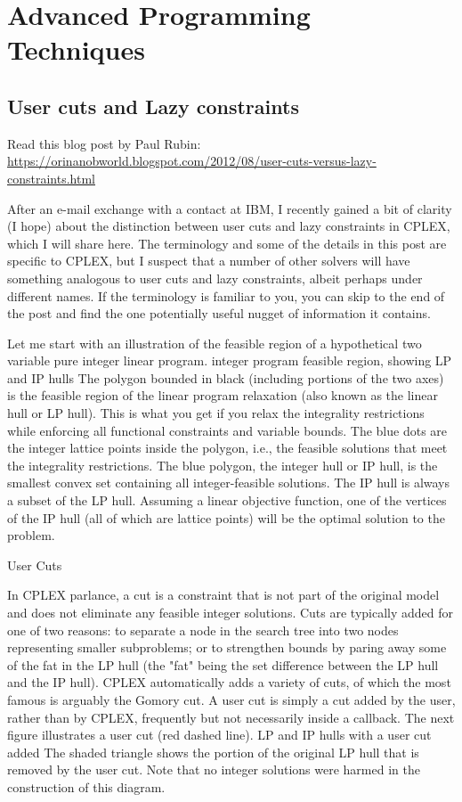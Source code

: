 \section{Advanced Programming Techniques}

\subsection{User cuts and Lazy constraints}
Read this blog post by Paul Rubin:
\url{https://orinanobworld.blogspot.com/2012/08/user-cuts-versus-lazy-constraints.html}

{\selectfont


After an e-mail exchange with a contact at IBM, I recently gained a bit of clarity (I hope) about the distinction between user cuts and lazy constraints in CPLEX, which I will share here. The terminology and some of the details in this post are specific to CPLEX, but I suspect that a number of other solvers will have something analogous to user cuts and lazy constraints, albeit perhaps under different names. If the terminology is familiar to you, you can skip to the end of the post and find the one potentially useful nugget of information it contains.

Let me start with an illustration of the feasible region of a hypothetical two variable pure integer linear program.
integer program feasible region, showing LP and IP hulls
The polygon bounded in black (including portions of the two axes) is the feasible region of the linear program relaxation (also known as the linear hull or LP hull). This is what you get if you relax the integrality restrictions while enforcing all functional constraints and variable bounds. The blue dots are the integer lattice points inside the polygon, i.e., the feasible solutions that meet the integrality restrictions. The blue polygon, the integer hull or IP hull, is the smallest convex set containing all integer-feasible solutions. The IP hull is always a subset of the LP hull. Assuming a linear objective function, one of the vertices of the IP hull (all of which are lattice points) will be the optimal solution to the problem.

User Cuts

In CPLEX parlance, a cut is a constraint that is not part of the original model and does not eliminate any feasible integer solutions. Cuts are typically added for one of two reasons: to separate a node in the search tree into two nodes representing smaller subproblems; or to strengthen bounds by paring away some of the fat in the LP hull (the "fat" being the set difference between the LP hull and the IP hull). CPLEX automatically adds a variety of cuts, of which the most famous is arguably the Gomory cut. A user cut is simply a cut added by the user, rather than by CPLEX, frequently but not necessarily inside a callback. The next figure illustrates a user cut (red dashed line).
LP and IP hulls with a user cut added
The shaded triangle shows the portion of the original LP hull that is removed by the user cut. Note that no integer solutions were harmed in the construction of this diagram.

}
